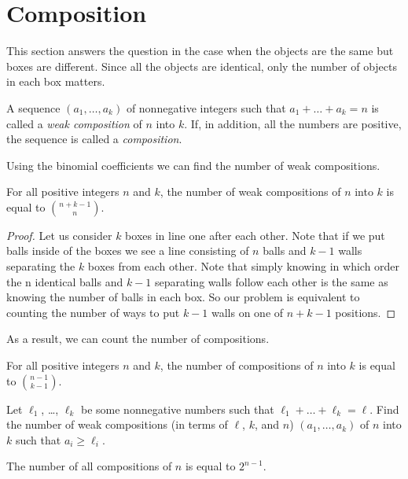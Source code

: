 \section{Composition}
This section answers the question in the case when the objects
are the same but boxes are different. Since all the objects
are identical, only the number of objects in each box matters.

\begin{definition}
  A sequence $(a_1, \dots, a_k)$ of nonnegative integers such
  that $a_1 + \dots + a_k = n$ is called a \emph{weak composition}
  of $n$ into $k$. If, in addition, all the numbers are positive,
  the sequence is called a \emph{composition}.
\end{definition}

Using the binomial coefficients we can find the number of weak
compositions.
\begin{theorem}
  For all positive integers $n$ and $k$,
  the number of weak compositions of $n$ into $k$ is equal to
  $\binom{n + k - 1}{n}$.
\end{theorem}
\begin{proof}
  Let us consider $k$ boxes in line one after each other. Note that if we
  put balls inside of the boxes we see a line consisting of $n$ balls and
  $k - 1$ walls separating the $k$ boxes from each other. Note that simply
  knowing in which order the n identical balls and $k - 1$ separating walls
  follow each other is the same as knowing the number of balls in each box.
  So our problem is equivalent to counting the number of ways to put $k - 1$
  walls on one of $n + k - 1$ positions.
\end{proof}

As a result, we can count the number of compositions.
\begin{corollary}
  For all positive integers $n$ and $k$,
  the number of compositions of $n$ into $k$ is equal to
  $\binom{n - 1}{k - 1}$.
\end{corollary}

\begin{exercise}
  Let $\ell_1$, \dots, $\ell_k$ be some nonnegative numbers
  such that $\ell_1 + \dots + \ell_k = \ell$.
  Find the number of weak compositions (in terms of $\ell$, $k$, and $n$)
  $(a_1, \dots, a_k)$ of $n$ into $k$ such that $a_i \ge \ell_i$.
\end{exercise}

\begin{corollary}
  The number of all compositions of $n$ is equal to $2^{n - 1}$.
\end{corollary}

